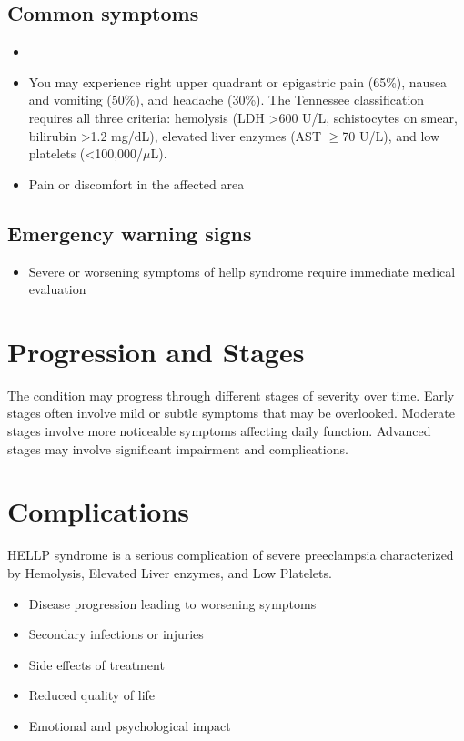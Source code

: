 \subsection{Common symptoms}
\begin{itemize}[noitemsep]
  \item \item You may experience right upper quadrant or epigastric pain (65\%), nausea and vomiting (50\%), and headache (30\%). The Tennessee classification requires all three criteria: hemolysis (LDH >600 U/L, schistocytes on smear, bilirubin >1.2 mg/dL), elevated liver enzymes (AST $\ge$70 U/L), and low platelets (<100,000/$\mu$L).

  \item Pain or discomfort in the affected area
  \end{itemize}

\subsection{Emergency warning signs}
\begin{itemize}[noitemsep]
  \item Severe or worsening symptoms of hellp syndrome require immediate medical evaluation
\end{itemize}
\section{Progression and Stages}
The condition may progress through different stages of severity over time. Early stages often involve mild or subtle symptoms that may be overlooked. Moderate stages involve more noticeable symptoms affecting daily function. Advanced stages may involve significant impairment and complications.
\section{Complications}
HELLP syndrome is a serious complication of severe preeclampsia characterized by Hemolysis, Elevated Liver enzymes, and Low Platelets.

\begin{itemize}[noitemsep]
  \item Disease progression leading to worsening symptoms
  \item Secondary infections or injuries
  \item Side effects of treatment
  \item Reduced quality of life
  \item Emotional and psychological impact
\end{itemize}
